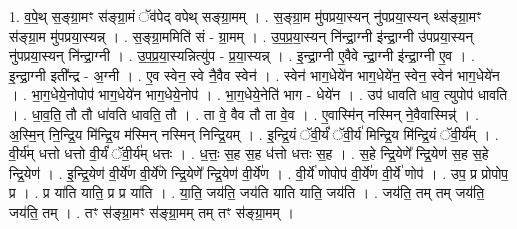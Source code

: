 \documentclass[17pt]{extarticle}
\begin{document}
1. व॒पे॒थ् स॒ङ्ग्रा॒मꣳ स॑ङ्ग्रा॒मं ॅव॑पेद् वपेथ् सङ्ग्रा॒मम् । . स॒ङ्ग्रा॒म मु॑पप्रया॒स्यन् नु॑पप्रया॒स्यन् थ्स॑ङ्ग्रा॒मꣳ स॑ङ्ग्रा॒म मु॑पप्रया॒स्यन्न् । . स॒ङ्ग्रा॒ममिति॑ सं - ग्रा॒मम् । . उ॒प॒प्र॒या॒स्यन् नि॑न्द्रा॒ग्नी इ॑न्द्रा॒ग्नी उ॑पप्रया॒स्यन् नु॑पप्रया॒स्यन् नि॑न्द्रा॒ग्नी । . उ॒प॒प्र॒या॒स्यन्नित्यु॑प - प्र॒या॒स्यन्न् । . इ॒न्द्रा॒ग्नी ए॒वैवे न्द्रा॒ग्नी इ॑न्द्रा॒ग्नी ए॒व । . इ॒न्द्रा॒ग्नी इती᳚न्द्र - अ॒ग्नी । . ए॒व स्वेन॒ स्वे नै॒वैव स्वेन॑ । . स्वेन॑ भाग॒धेये॑न भाग॒धेये॑न॒ स्वेन॒ स्वेन॑ भाग॒धेये॑न । . भा॒ग॒धेये॒नोपोप॑ भाग॒धेये॑न भाग॒धेये॒नोप॑ । . भा॒ग॒धेये॒नेति॑ भाग - धेये॑न । . उप॑ धावति धाव॒ त्युपोप॑ धावति । . धा॒व॒ति॒ तौ तौ धा॑वति धावति॒ तौ । . ता वे॒ वैव तौ ता वे॒व । . ए॒वास्मि॑न् नस्मिन् ने॒वैवास्मिन्न्॑ । . अ॒स्मि॒न् नि॒न्द्रि॒य मि॑न्द्रि॒य म॑स्मिन् नस्मिन् निन्द्रि॒यम् । . इ॒न्द्रि॒यं ॅवी॒र्यं॑ ॅवी॒र्य॑ मिन्द्रि॒य मि॑न्द्रि॒यं ॅवी॒र्य᳚म् । . वी॒र्य॑म् धत्तो धत्तो वी॒र्यं॑ ॅवी॒र्य॑म् धत्तः । . ध॒त्तः॒ स॒ह स॒ह ध॑त्तो धत्तः स॒ह । . स॒हे न्द्रि॒येणे᳚ न्द्रि॒येण॑ स॒ह स॒हे न्द्रि॒येण॑ । . इ॒न्द्रि॒येण॑ वी॒र्ये॑ण वी॒र्ये॑णे न्द्रि॒येणे᳚ न्द्रि॒येण॑ वी॒र्ये॑ण । . वी॒र्ये॑ णोपोप॑ वी॒र्ये॑ण वी॒र्ये॑ णोप॑ । . उप॒ प्र प्रोपोप॒ प्र । . प्र या॑ति याति॒ प्र प्र या॑ति । . या॒ति॒ जय॑ति॒ जय॑ति याति याति॒ जय॑ति । . जय॑ति॒ तम् तम् जय॑ति॒ जय॑ति॒ तम् । . तꣳ स॑ङ्ग्रा॒मꣳ स॑ङ्ग्रा॒मम् तम् तꣳ स॑ङ्ग्रा॒मम् । \newline
\end{document}
